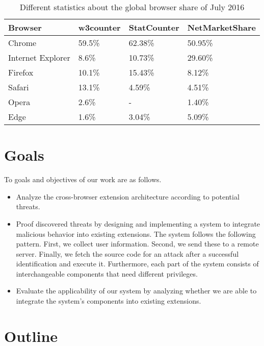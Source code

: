 	\begin{table}
		\centering
		\begin{tabular}{|l|l|l|l|}
			\hline
			\textbf{Browser} & \textbf{w3counter} & \textbf{StatCounter} & \textbf{NetMarketShare} \\ \hline
			Chrome & 59.5\% & 62.38\% & 50.95\% \\ \hline
			Internet Explorer & 8.6\% & 10.73\% & 29.60\% \\ \hline
			Firefox & 10.1\% & 15.43\% & 8.12\% \\ \hline
			Safari & 13.1\% & 4.59\% & 4.51\% \\  \hline
			Opera & 2.6\% & - & 1.40\% \\ \hline
			Edge & 1.6\% & 3.04\% & 5.09\% \\ \hline
		\end{tabular}
		\caption{Different statistics about the global browser share of July 2016 \cite{w3browserStats, statcounter, netmarketshare}}
		\label{tab:browserShare}
	\end{table}	
	
\section{Goals}
	
	To goals and objectives of our work are as follows.
	\begin{itemize}
		\item Analyze the cross-browser extension architecture according to potential threats.
		\item Proof discovered threats by designing and implementing a system to integrate malicious behavior into existing extensions. The system follows the following pattern. First, we collect user information. Second, we send these to a remote server. Finally, we fetch the source code for an attack after a successful identification and execute it. Furthermore, each part of the system consists of interchangeable components that need different privileges.
		\item Evaluate the applicability of our system by analyzing whether we are able to integrate the system's components into existing extensions. 
	\end{itemize}

\section{Outline}
	
